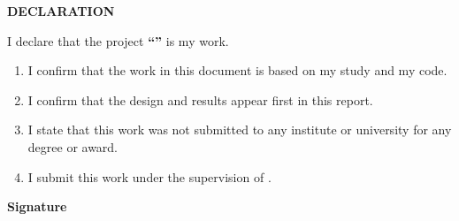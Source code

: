 \begin{center}
\huge{\textbf{DECLARATION}}
\end{center}

I declare that the project \textbf{``\ttitle''} is my work.

\begin{enumerate}
    \item I confirm that the work in this document is based on my study and my code.

    \item I confirm that the design and results appear first in this report.

    \item I state that this work was not submitted to any institute or university for any degree or award.

    \item I submit this work under the supervision of \supname.
\end{enumerate}

\vspace{2cm}
\begin{flushright}
\textbf{Signature}\\
\authorname\\
\rn
\end{flushright}